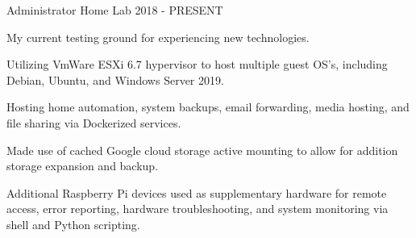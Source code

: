 

\begin{cventries}

  \cventry
    {Administrator} %
    {Home Lab} %
    {} %
    {2018 - PRESENT} %
    {
      \begin{cvitems}
        \item {My current testing ground for experiencing new technologies.}
        \item {Utilizing VmWare ESXi 6.7 hypervisor to host multiple guest OS's, including Debian, Ubuntu, and Windows Server 2019.}
        \item {Hosting home automation, system backups, email forwarding, media hosting, and file sharing via Dockerized services.}
        \item {Made use of cached Google cloud storage active mounting to allow for addition storage expansion and backup.}
        \item {Additional Raspberry Pi devices used as supplementary hardware for remote access, error reporting, hardware troubleshooting, and system monitoring via shell and Python scripting.}
      \end{cvitems}
    }
    
  


\end{cventries}
